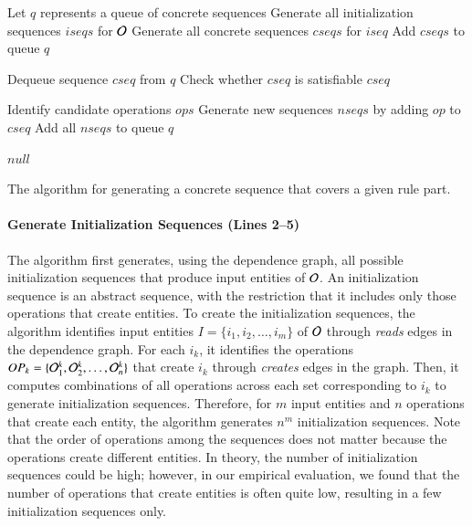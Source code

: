 \begin{algorithm}[t]
\small
\SetAlgoVlined
{}
\BlankLine

\nl Let $q$ represents a queue of concrete sequences\;
\nl Generate all initialization sequences $iseqs$ for ${\cal O}$\;
\nl {}
{
		\nl Generate all concrete sequences $cseqs$ for $iseq$\;
		\nl Add $cseqs$ to queue $q$\;
} 

\nl {}
{
		\nl Dequeue sequence $cseq$ from $q$\;
		\nl Check whether $cseq$ is satisfiable\;
		\nl {}
		{
				\Return $cseq$\;
		}
		
		\nl Identify candidate operations $ops$\;		
		\nl {}
		{
			\nl Generate new sequences $nseqs$ by adding $op$ to $cseq$\;
			\nl Add all $nseqs$ to queue $q$\;
		}
}

\Return $null$\;
		
\caption{\label{alg:guidedsearch} The algorithm for
  generating a concrete sequence that covers a given rule part.}
\end{algorithm}

\paragraph*{Generate Initialization Sequences (Lines 2--5)} The algorithm first
generates, using the dependence graph, all possible initialization sequences
that produce input entities of ${\cal O}$. An initialization sequence is an
abstract sequence, with the restriction that it includes only those operations
that create entities. To create the initialization sequences, the algorithm
identifies input entities $I = \{i_1, i_2, \ldots, i_m\}$ of ${\cal O}$ through
\textit{reads} edges in the dependence graph. For each $i_k$, it identifies the
operations $OP_k = \{{\cal O}^k_1, {\cal O}^k_2, \ldots, {\cal O}^k_n\}$ that
create $i_k$ through \textit{creates} edges in the graph.
Then, it computes combinations of all operations across each set corresponding
to $i_k$ to generate initialization sequences. Therefore, for $m$ input entities
and $n$ operations that create each entity, the algorithm generates $n^m$
initialization sequences. Note that the order of operations among the sequences
does not matter because the operations create different entities.  In theory,
the number of initialization sequences could be high; however, in our empirical
evaluation, we found that the number of operations that create entities is often
quite low, resulting in a few initialization sequences only.

